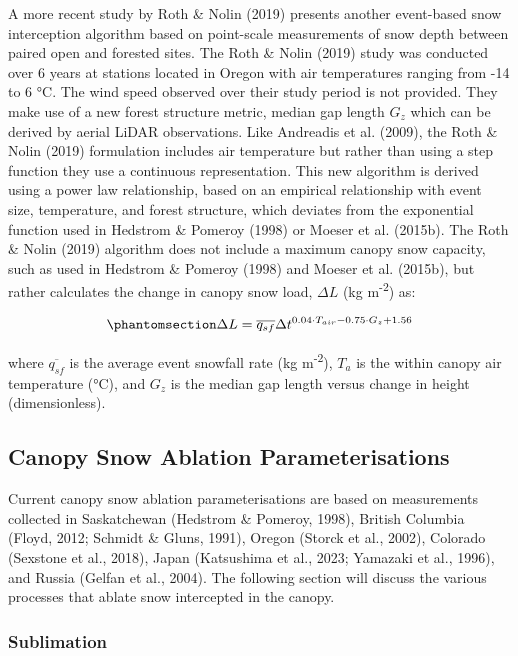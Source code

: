 \documentclass[
  letterpaper,
]{tex/uofsthesis-cs}
\begin{document}
A more recent study by Roth \& Nolin (2019) presents another event-based
snow interception algorithm based on point-scale measurements of snow
depth between paired open and forested sites. The Roth \& Nolin (2019)
study was conducted over 6 years at stations located in Oregon with air
temperatures ranging from -14 to 6 °C. The wind speed observed over
their study period is not provided. They make use of a new forest
structure metric, median gap length \(G_z\) which can be derived by
aerial LiDAR observations. Like Andreadis et al. (2009), the Roth \&
Nolin (2019) formulation includes air temperature but rather than using
a step function they use a continuous representation. This new algorithm
is derived using a power law relationship, based on an empirical
relationship with event size, temperature, and forest structure, which
deviates from the exponential function used in Hedstrom \& Pomeroy
(1998) or Moeser et al. (2015b). The Roth \& Nolin (2019) algorithm does
not include a maximum canopy snow capacity, such as used in Hedstrom \&
Pomeroy (1998) and Moeser et al. (2015b), but rather calculates the
change in canopy snow load, \(\Delta L\) (kg m\textsuperscript{-2}) as:

\begin{equation}\phantomsection\label{eq-roth-i}{
\Delta L = \overline{q_{sf}} \Delta t ^{0.04 \cdot T_{air} - 0.75 \cdot G_z + 1.56}
}\end{equation}

where \(\overline{q_{sf}}\) is the average event snowfall rate (kg
m\textsuperscript{-2}), \(T_{a}\) is the within canopy air temperature
(°C), and \(G_z\) is the median gap length versus change in height
(dimensionless).

\subsection{Canopy Snow Ablation Parameterisations}\label{sec-ablation}

Current canopy snow ablation parameterisations are based on measurements
collected in Saskatchewan (Hedstrom \& Pomeroy, 1998), British Columbia
(Floyd, 2012; Schmidt \& Gluns, 1991), Oregon (Storck et al., 2002),
Colorado (Sexstone et al., 2018), Japan (Katsushima et al., 2023;
Yamazaki et al., 1996), and Russia (Gelfan et al., 2004). The following
section will discuss the various processes that ablate snow intercepted
in the canopy.

\subsubsection{Sublimation}\label{sublimation}
\end{document}

